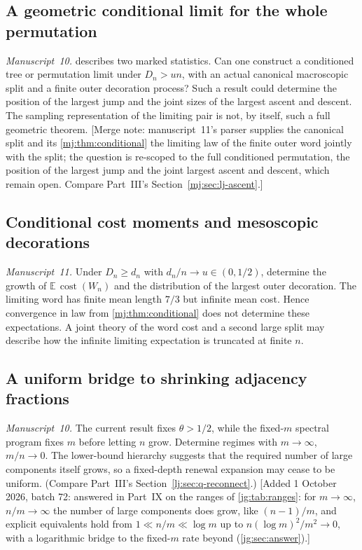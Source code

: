 \documentclass[11pt,a4paper]{article}
\theoremstyle{definition}\newaliascnt{definition}{theorem}
\theoremstyle{remark}\newaliascnt{remark}{theorem}
\newcommand{\ljE}{\mathbb E}
\newcommand{\ljcost}{\operatorname{cost}}
\begin{document}
\subsection{A geometric conditional limit for the whole permutation}
\label{cjm:sec:mj-geometric}
\emph{Manuscript~10.}  describes two marked
statistics. Can one construct a conditioned tree or permutation limit under
$D_n>un$, with an actual canonical macroscopic split and a finite outer
decoration process? Such a result could determine the position of the
largest jump and the joint sizes of the largest ascent and descent. The
sampling representation of the limiting pair is not, by itself, such a full
geometric theorem. [Merge note: manuscript~11's parser supplies the canonical
split and its \cref{mj:thm:conditional} the limiting law of the finite outer
word jointly with the split; the question is re-scoped to the full
conditioned permutation, the position of the largest jump and the joint
largest ascent and descent, which remain open. Compare Part~III's
Section~\ref{mj:sec:lj-ascent}.]

\subsection{Conditional cost moments and mesoscopic decorations}
\emph{Manuscript~11.} Under $D_n\ge d_n$ with $d_n/n\to u\in(0,1/2)$,
determine the growth of $\ljE\,\ljcost(W_n)$ and the distribution of the
largest outer decoration. The limiting word has finite mean length $7/3$ but
infinite mean cost. Hence convergence in law from \cref{mj:thm:conditional}
does not determine these expectations. A joint theory of the word cost and a
second large split may describe how the infinite limiting expectation is
truncated at finite $n$.

\subsection{A uniform bridge to shrinking adjacency fractions}
\label{pr:sec:mj-bridge}
\emph{Manuscript~10.} The current result fixes $\theta>1/2$, while the
fixed-$m$ spectral program fixes $m$ before letting $n$ grow. Determine
regimes with $m\to\infty$, $m/n\to0$. The lower-bound hierarchy suggests that
the required number of large components itself grows, so a fixed-depth
renewal expansion may cease to be uniform. (Compare Part~III's
Section~\ref{lj:sec:q-reconnect}.)
[Added 1 October 2026, batch 72: answered in Part~IX on the ranges of
\cref{jg:tab:ranges}: for $m\to\infty$, $n/m\to\infty$ the number of large
components does grow, like $(n-1)/m$, and explicit equivalents hold from
$1\ll n/m\ll\log m$ up to $n(\log m)^2/m^2\to0$, with a logarithmic bridge to
the fixed-$m$ rate beyond (\cref{jg:sec:answer}).]
\end{document}
